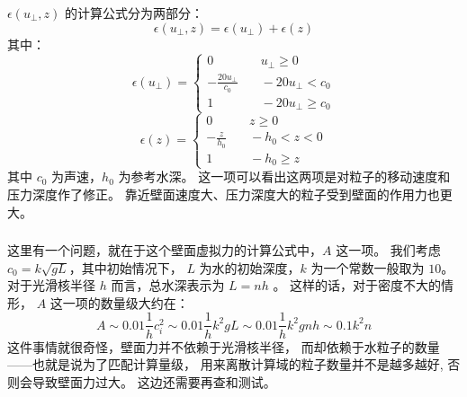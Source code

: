 \begin{frame}
    \frametitle{\subsecname}
    $\epsilon(u_{\perp},z)$ 的计算公式分为两部分：
    \begin{equation}
        \epsilon(u_{\perp},z)=\epsilon (u_{\perp})+\epsilon(z)
    \end{equation}
    其中：
    \begin{equation}
        \epsilon(u_{\perp})=
        \begin{cases}
            0 &\quad u_{\perp}\geq 0\\
            -\frac{20u_{\perp}}{c_0} &\quad -20u_{\perp}<c_0\\
            1 &\quad -20u_{\perp}\geq c_0
        \end{cases}
    \end{equation}
    \begin{equation}
        \epsilon(z)=
        \begin{cases}
            0 &\quad z\geq 0\\
            -\frac{z}{h_0} &\quad -h_0<z<0\\
            1 &\quad -h_0\geq z
        \end{cases}
    \end{equation}
    其中 $c_0$ 为声速，$h_0$ 为参考水深。
    这一项可以看出这两项是对粒子的移动速度和压力深度作了修正。
    靠近壁面速度大、压力深度大的粒子受到壁面的作用力也更大。
\end{frame}

\begin{frame}
    \frametitle{\subsecname}
    这里有一个问题，就在于这个壁面虚拟力的计算公式中，$A$ 这一项。
    我们考虑 $c_0=k\sqrt{gL}$，其中初始情况下，
    $L$ 为水的初始深度，$k$ 为一个常数一般取为 $10$。
    对于光滑核半径 $h$ 而言，总水深表示为 $L=nh$ 。
    这样的话，对于密度不大的情形，
    $A$ 这一项的数量级大约在：
    \begin{equation}
        A\sim 0.01\frac{1}{h}c_i^2\sim 0.01\frac{1}{h}k^2gL
        \sim 0.01\frac{1}{h}k^2gnh\sim 0.1k^2n
    \end{equation}
    这件事情就很奇怪，壁面力并不依赖于光滑核半径，
    而却依赖于水粒子的数量——也就是说为了匹配计算量级，
    用来离散计算域的粒子数量并不是越多越好,
    否则会导致壁面力过大。
    这边还需要再查和测试。
    \begin{figure}[H]
        \centering
    \end{figure}
\end{frame}

